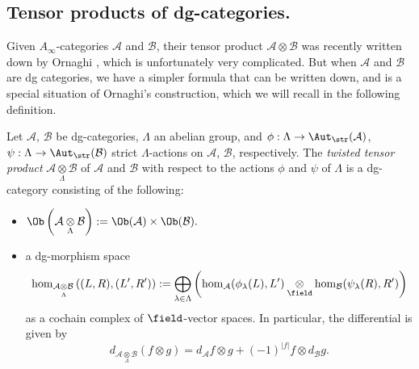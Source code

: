 \subsection{Tensor products of dg-categories.} Given $A_{\infty}$-categories $\mathcal{A}$ and $\mathcal{B}$, their tensor product $\mathcal{A}\otimes\mathcal{B}$ was recently written down by Ornaghi \cite{Ornaghi25}, which is unfortunately very complicated. But when $\mathcal{A}$ and $\mathcal{B}$ are dg categories, we have a simpler formula that can be written down, and is a special situation of Ornaghi's construction, which we will recall in the following definition.
\begin{defn}
Let $\mathcal{A}$, $\mathcal{B}$ be dg-categories,
$\Lambda$ an abelian group,
and
$\phi:\Lambda\rightarrow\Aut_{\str}(\mathcal{A})$,
$\psi:\Lambda\rightarrow\Aut_{\str}(\mathcal{B})$
strict $\Lambda$-actions on $\mathcal{A}$, $\mathcal{B}$,
respectively.
The \emph{twisted tensor product}
$
\mathcal{A}\underset{\Lambda}{\otimes}\mathcal{B}
$
of $\mathcal{A}$ and $\mathcal{B}$
with respect to the actions $\phi$ and $\psi$ of $\Lambda$
is a dg-category
consisting of the following:

\begin{itemize}
\item
$
\Ob\left(\mathcal{A}\underset{\Lambda}{\otimes}\mathcal{B}\right)
:=
\Ob(\mathcal{A})\times \Ob(\mathcal{B}).
$

\item
a dg-morphism space
$$
\hom_{\mathcal{A}\underset{\Lambda}{\otimes}\mathcal{B}}
\left((L,R),(L',R')\right)
:=
\displaystyle\bigoplus_{\lambda\in\Lambda}
\left(
\hom_{\mathcal{A}}(\phi_{\lambda}(L),L')
\underset{\field}{\otimes}
\hom_{\mathcal{B}}(\psi_{\lambda}(R),R')
\right)
$$
as a cochain complex of $\field$-vector spaces.
In particular,
the differential is given by
$$
d_{\mathcal{A}\underset{\Lambda}{\otimes}\mathcal{B}}
(f\otimes g)
=
d_{\mathcal{A}}f \otimes g
+
(-1)^{|f|}
f \otimes d_{\mathcal{B}}g.
$$


\end{itemize}
\end{defn}
